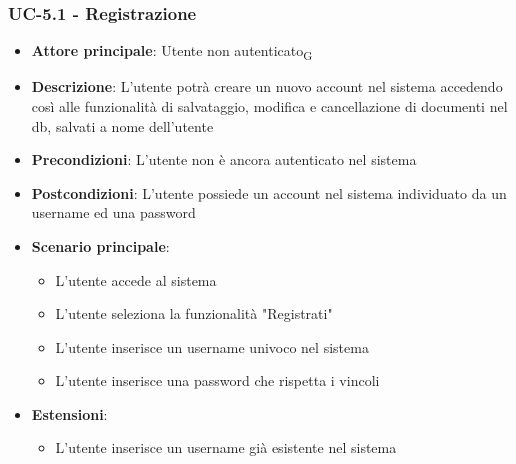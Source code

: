 \documentclass[11pt,a4paper]{article}
\newcommand{\gls}[1]{#1\textsubscript{G}}
\begin{document}
\subsubsection{UC-5.1 - Registrazione}
\begin{itemize}
    \item \textbf{Attore principale}: \gls{Utente non autenticato}
    \item \textbf{Descrizione}: L'utente potrà creare un nuovo account nel sistema accedendo così alle funzionalità di salvataggio, modifica e cancellazione di documenti nel db, salvati a nome dell'utente
    \item \textbf{Precondizioni}: L'utente non è ancora autenticato nel sistema
    \item \textbf{Postcondizioni}: L'utente possiede un account nel sistema individuato da un username ed una password
    \item \textbf{Scenario principale}:
        \begin{itemize}
            \item L'utente accede al sistema
            \item L'utente seleziona la funzionalità "Registrati"
            \item L'utente inserisce un username univoco nel sistema
            \item L'utente inserisce una password che rispetta i vincoli
        \end{itemize}
    \item \textbf{Estensioni}:
        \begin{itemize}
            \item L'utente inserisce un username già esistente nel sistema
        \end{itemize}
\end{itemize}
\end{document}
